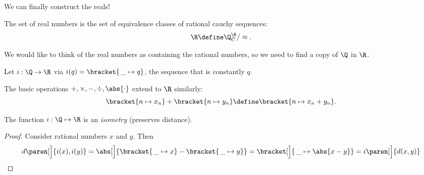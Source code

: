 \documentclass{scrartcl}
\newcommand{\dist}{d}
\begin{document}
We can finally construct the reals!
\begin{defn}
  The set of real numbers is the set of equivalence classes of rational cauchy sequences:
  \[\R \define \Q^\N_{C}/\approx.\]
\end{defn}

We would like to think of the real numbers as containing the rational numbers, so we need to find a copy of \(\Q\) in \(\R\).
\begin{defn}
  Let \(i: \Q \to \R\) via \(i(q) = \bracket{\,\_{} \mapsto q}\), the sequence that is constantly \(q\).
\end{defn}

The basic operations \(+,\times,-,\div,\abs{\cdot}\) extend to \(\R\) similarly:
\[
  \bracket{n\mapsto x_{n}} + \bracket{n\mapsto y_{n}} \define \bracket{n\mapsto x_{n}+y_{n}}.
\]
\begin{theorem}
  The function \(i: \Q \mapsto \R\) is an \emph{isometry} (preserves distance).
\end{theorem}
\begin{proof}
  Consider rational numbers \(x\) and \(y\). Then
  \[
    \dist\paren[\Big]{i(x),i(y)} = \abs[\Big]{\bracket{\,\_{}\mapsto x}- \bracket{\,\_{}\mapsto y}} = \bracket[\Big]{\,\_{}\mapsto \abs{x-y}} = i\paren[\Big]{\dist(x,y)}
  \]
\end{proof}
\end{document}
